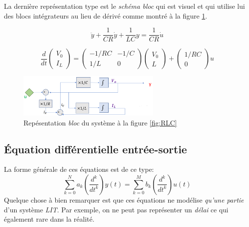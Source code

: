 \documentclass{report}
\begin{document}
La dernière représentation type est le \textit{schéma bloc} qui est visuel et qui utilise lui des blocs intégrateurs au lieu de dérivé comme montré à la figure \ref{fig:bloc}.

\begin{equation} \label{eqn:es}
\ddot{y} + \frac{1}{CR}\dot{y} + \frac{1}{LC}y = \frac{1}{CR}\dot{u}
\end{equation}

\begin{equation} \label{eqn:mat}
\frac{d}{dt}\begin{pmatrix}
V_0\\
I_L
\end{pmatrix} = \begin{pmatrix}
-1/RC & -1/C\\
1/L & 0
\end{pmatrix} \begin{pmatrix}
V_0\\
L
\end{pmatrix} + \begin{pmatrix}
1/RC\\
0
\end{pmatrix} u
\end{equation}

\begin{figure}[H] 
\centering
\includegraphics[width=7cm]{img/bloc.png}
\caption{Repésentation \textit{bloc} du système à la figure \ref{fig:RLC}}
\label{fig:bloc}
\end{figure}

\subsection{Équation différentielle entrée-sortie}
La forme générale de ces équations est de ce type:
\begin{equation}\label{eqn:difes}
\sum_{k = 0}^{N} a_k (\frac{d^k}{dt^k}) y(t) = \sum_{k = 0}^M b_k (\frac{d^k}{dt^k}) u(t)
\end{equation}
Quelque chose à bien remarquer est que ces équations ne modélise \textit{qu'une partie} d'un système \textit{LIT}. Par exemple, on ne peut pas représenter un \textit{délai} ce qui également rare dans la réalité.\\
\end{document}
